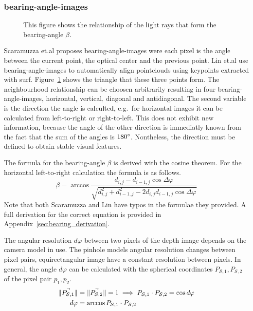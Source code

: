 \subsubsection{\Glspl{bearing-angle-image}}

\begin{figure}[H]
    \centering
    \caption[Schematic Representation of Bearing-Angles]{This figure shows the relationship of the light rays that form the \gls{bearing-angle} $\beta$.}\label{fig:bearing_angle}
\end{figure}

Scaramuzza et.al\cite{Scaramuzza2007} proposes \Glspl{bearing-angle-image} were each pixel is the angle between the current point, the optical center and the previous point.
Lin et.al\cite{Lin2017} use \Glspl{bearing-angle-image} to automatically align pointclouds using keypoints extracted with \acrshort{surf}.
Figure~\ref{fig:bearing_angle} shows the triangle that these three points form.
The neighbourhood relationship can be choosen arbitrarily resulting in four \Glspl{bearing-angle-image}, horizontal, vertical, diagonal and antidiagonal.
The second variable is the direction the angle is calculted, e.g.~for horizontal images it can be calculated from left-to-right or right-to-left.
This does not exhibit new information, because the angle of the other direction is immediatly known from the fact that the sum of the angles is $180\degree$.
Nontheless, the direction must be defined to obtain stable visual features.

The formula for the \gls{bearing-angle} $\beta$ is derived with the cosine theorem.
For the horizontal left-to-right calculation the formula is as follows.
\begin{equation}
    \beta = \arccos%
            \frac{d_{i,j} - d_{i-1,j} \cos \Delta\varphi}%
                 {\sqrt{d_{i,j}^2 + d_{i-1,j}^2 - 2 d_{i,j} d_{i-1,j} \cos \Delta\varphi}}
\end{equation}
Note that both Scaramuzza\cite{Scaramuzza2007} and Lin\cite{Lin2017} have typos in the formulae they provided.
A full derivation for the correct equation is provided in Appendix~\ref{sec:bearing_derivation}.

The angular resolution $d\varphi$ between two pixels of the depth image depends on the camera model in use.
The pinhole models angular resolution changes between pixel pairs, equirectangular image have a constant resolution between pixels.
In general, the angle $d\varphi$ can be calculated with the spherical coordinates $P_{\mathcal{S},1}, P_{\mathcal{S},2}$ of the pixel pair $p_1, p_2$.
\begin{equation}
\begin{aligned}
    \lVert\vec{P_{\mathcal{S},1}}\rVert &= \lVert\vec{P_{\mathcal{S},2}}\rVert = 1 \implies P_{\mathcal{S},1} \cdot P_{\mathcal{S},2} = \cos d\varphi \\
    d\varphi &= \arccos P_{\mathcal{S},1} \cdot P_{\mathcal{S},2}
\end{aligned}
\end{equation}

